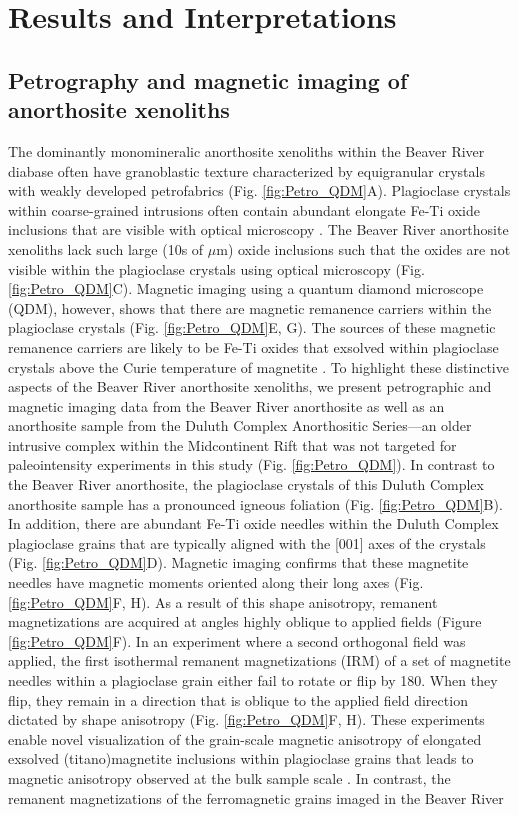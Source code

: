 \documentclass[9pt,twocolumn,twoside,lineno]{pnas-new}
\begin{document}
\section*{Results and Interpretations}

\subsection*{Petrography and magnetic imaging of anorthosite xenoliths}

The dominantly monomineralic anorthosite xenoliths within the Beaver River diabase often have granoblastic texture characterized by equigranular crystals with weakly developed petrofabrics (Fig. \ref{fig:Petro_QDM}A). Plagioclase crystals within coarse-grained intrusions often contain abundant elongate Fe-Ti oxide inclusions that are visible with optical microscopy \cite{Feinberg2006a, Wenk2011a, Ageeva2016a}. The Beaver River anorthosite xenoliths lack such large (10s of $\mu$m) oxide inclusions such that the oxides are not visible within the plagioclase crystals using optical microscopy (Fig. \ref{fig:Petro_QDM}C). Magnetic imaging using a quantum diamond microscope (QDM), however, shows that there are magnetic remanence carriers within the plagioclase crystals (Fig. \ref{fig:Petro_QDM}E, G). The sources of these magnetic remanence carriers are likely to be Fe-Ti oxides that exsolved within plagioclase crystals above the Curie temperature of magnetite \cite{Zhang2021b, Bian2021a}. To highlight these distinctive aspects of the Beaver River anorthosite xenoliths, we present petrographic and magnetic imaging data from the Beaver River anorthosite as well as an anorthosite sample from the Duluth Complex Anorthositic Series---an older intrusive complex within the Midcontinent Rift that was not targeted for paleointensity experiments in this study (Fig. \ref{fig:Petro_QDM}). In contrast to the Beaver River anorthosite, the plagioclase crystals of this Duluth Complex anorthosite sample has a pronounced igneous foliation (Fig. \ref{fig:Petro_QDM}B). In addition, there are abundant Fe-Ti oxide needles within the Duluth Complex plagioclase grains that are typically aligned with the [001] axes of the crystals (Fig. \ref{fig:Petro_QDM}D). Magnetic imaging confirms that these magnetite needles have magnetic moments oriented along their long axes (Fig. \ref{fig:Petro_QDM}F, H). As a result of this shape anisotropy, remanent magnetizations are acquired at angles highly oblique to applied fields (Figure \ref{fig:Petro_QDM}F). In an experiment where a second orthogonal field was applied, the first isothermal remanent magnetizations (IRM) of a set of magnetite needles within a plagioclase grain either fail to rotate or flip by 180\textdegree. When they flip, they remain in a direction that is oblique to the applied field direction dictated by shape anisotropy (Fig. \ref{fig:Petro_QDM}F, H). These experiments enable novel visualization of the grain-scale magnetic anisotropy of elongated exsolved (titano)magnetite inclusions within plagioclase grains that leads to magnetic anisotropy observed at the bulk sample scale \cite{Selkin2000a, Feinberg2006a}. In contrast, the remanent magnetizations of the ferromagnetic grains imaged in the Beaver River 
\end{document}

